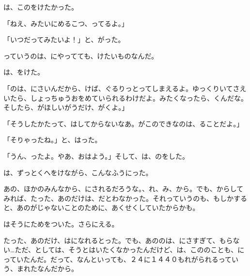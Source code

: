 は、このをけたかった。

「ねえ、みたいにめるこつ、ってるよ。」

「いつだってみたいよ！」と、がった。

っていうのは、にやってても、けたいものなんだ。

は、をけた。

「のは、にさいんだから、けば、ぐるりっとってしまえるよ。ゆっくりいてさえいたら、しょっちゅうおをめていられるわけだよ。みたくなったら、くんだな。そしたら、がほしいがうだけ、がくよ。」

「そうしたかたって、はしてからないなあ。がこのできなのは、ることだよ。」

「そりゃったね。」と、はった。

「うん、ったよ。やあ、おはよう。」そして、は、のをした。

は、ずっとくへをけながら、こんなふうにった。

あの、ほかのみんなから、にされるだろうな。、れ、み、から。でも、からしてみれば、たった、あのだけは、だとわなかった。それっていうのも、もしかすると、あのがじゃないことのために、あくせくしていたからかも。

はそうにためをついた。さらにえる。

たった、あのだけ、はになれるとった。でも、あののは、にさすぎて、もらない…ただ、としては、そうとはいたくなかったんだけど、は、こののことも、にっていたんだ。だって、なんといっても、２４に１４４０もれがられるっていう、まれたなんだから。


